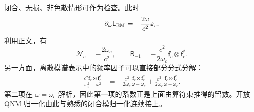 \begin{derivation}
闭合、无损、非色散情形可作为检查。此时
\[
\partial_\omega\mathsf L_{\rm EM}
=-\frac{2\omega}{c^2}\boldsymbol\varepsilon_r.
\]
利用正文，有
\[
\mathcal N_c=-\frac{2\omega_c}{c^2},
\qquad
\mathsf R_{-1}
=-\frac{c^2}{2\omega_c}
\mathbf f_c\otimes\mathbf f_c^*.
\]
另一方面，离散模谱表示中的频率因子可以直接部分分式分解：
\begin{align*}
\frac{c^2\mathbf f_c\otimes\mathbf f_c^*}{\omega_c^2-\omega^2}
&=-\frac{c^2}{2\omega_c}
\frac{\mathbf f_c\otimes\mathbf f_c^*}{\omega-\omega_c}
+\frac{c^2}{2\omega_c}
\frac{\mathbf f_c\otimes\mathbf f_c^*}{\omega+\omega_c}.
\end{align*}
第二项在 \(\omega=\omega_c\) 解析，因此第一项的系数正是上面由算符束推得的留数。开放 QNM 归一化由此与熟悉的闭合模归一化连续接上。
\end{derivation}

